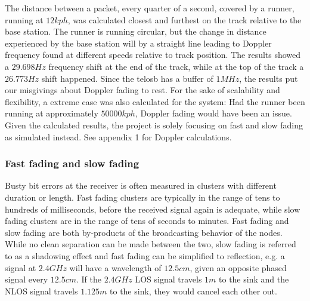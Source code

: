 \noindent The distance between a packet, every quarter of a second, covered by a runner, running at $12kph$, was calculated closest and furthest on the track relative to the base station. The runner is running circular, but the change in distance experienced by the base station will by a straight line leading to Doppler frequency found at different speeds relative to track position. The results showed a $29.698Hz$ frequency shift at the end of the track, while at the top of the track a $26.773Hz$ shift happened. Since the telosb has a buffer of $1MHz$, the results put our misgivings about Doppler fading to rest. For the sake of scalability and flexibility, a extreme case was also calculated for the system: Had the runner been running at approximately $50000kph$, Doppler fading would have been an issue. Given the calculated results, the project is solely focusing on fast and slow fading as simulated instead. See appendix 1 for Doppler calculations.

\subsubsection{Fast fading and slow fading}

Busty bit errors at the receiver is often measured in clusters with different duration or length. Fast fading clusters are typically in the range of tens to hundreds of milliseconds, before the received signal again is adequate, while slow fading clusters are in the range of tens of seconds to minutes. Fast fading and slow fading are both by-products of the broadcasting behavior of the nodes. While no clean separation can be made between the two, slow fading is referred to as a shadowing effect and fast fading can be simplified to reflection, e.g. a signal at $2.4GHz$ will have a wavelength of $12.5cm$, given an opposite phased signal every $12.5cm$. If the $2.4GHz$ LOS signal travels $1m$ to the sink and the NLOS signal travels $1.125m$ to the sink, they would cancel each other out.

